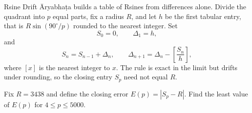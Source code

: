 \begin{problem}{Rsine Drift}
Āryabhaṭa builds a table of Rsines from differences alone. Divide the quadrant into \(p\) equal parts, fix a radius \(R\), and let \(h\) be the first tabular entry, that is \(R\sin(90^\circ/p)\) rounded to the nearest integer. Set
    \[
    S_0=0,\qquad \Delta_1=h,
    \]
and
    \[
    S_n=S_{n-1}+\Delta_n,\qquad
    \Delta_{n+1}=\Delta_n-\left[\frac{S_n}{h}\right],
    \]
where \([x]\) is the nearest integer to \(x\). The rule is exact in the limit but drifts under rounding, so the closing entry \(S_p\) need not equal \(R\).

Fix \(R=3438\) and define the closing error \(E(p)=|S_p-R|\). Find the least value of \(E(p)\) for \(4\le p\le5000\).
\end{problem}